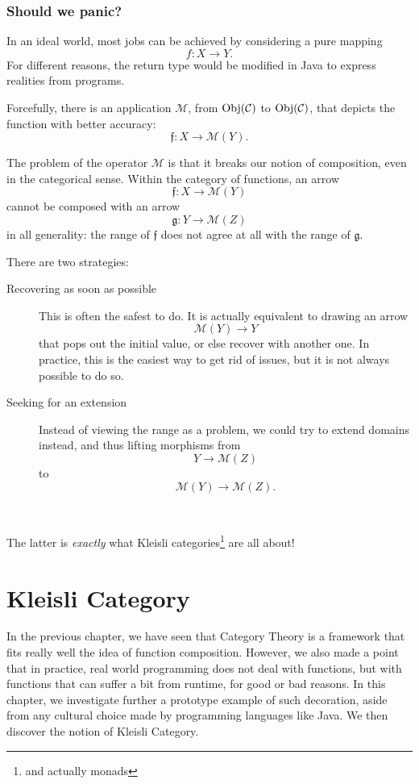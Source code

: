 \documentclass[12pt,a4paper]{report}
\theoremstyle{theorem}
\theoremstyle{definition}
\begin{document}
\subsection{Should we panic?}

In an ideal world, most jobs can be achieved by considering a pure
mapping
	\[ f: X\to Y .\]
For different reasons, the return type would be modified in Java
to express realities from programs.

Forcefully, there is an application $\mathcal{M}$,
from ${\rm Obj}(\mathcal{C})$ to ${\rm Obj}(\mathcal{C})$,
that depicts the function with better accuracy:
	\[ \mathfrak{f} : X\to \mathcal{M}(Y) .\]

The problem of the operator $\mathcal{M}$ is that it breaks
our notion of composition, even in the categorical sense.
Within the category of functions,
an arrow
	\[ \mathfrak{f} : X\to \mathcal{M}(Y)\]
cannot be composed with an arrow
	\[ \mathfrak{g} : Y\to \mathcal{M}(Z) \]
in all generality: the range of $\mathfrak{f}$ does not agree at
all with the range of $\mathfrak{g}$.

There are two strategies:
	\begin{description}
		\item[Recovering as soon as possible]This is often the safest to
		do. It is actually equivalent to drawing an arrow
			\[ \mathcal{M}(Y) \to Y \]
		that pops out the initial value, or else recover with another one.
		In practice, this is the easiest way to get rid of issues, but
		it is not always possible to do so.
		\item[Seeking for an extension]Instead of viewing the range 
		as a problem, we could try to extend domains instead, and thus
		lifting morphisms from
			\[ Y\to \mathcal{M}(Z) \]
		to
			\[ \mathcal{M}(Y) \to \mathcal{M}(Z) .\]
	\end{description}

~\newline

\begin{center}
The latter is \emph{exactly} what Kleisli categories\footnote{and actually
monads} are all about!
\end{center}

\chapter{Kleisli Category}

In the previous chapter, we have seen that Category Theory is a framework
that fits really well the idea of function composition.
However, we also made a point that in practice, real world programming
does not deal with functions, but with functions that can suffer a bit
from runtime, for good or bad reasons.
In this chapter, we investigate further a prototype example
of such decoration, aside from any cultural choice made by programming
languages like Java. We then discover the notion of Kleisli Category.
\end{document}
